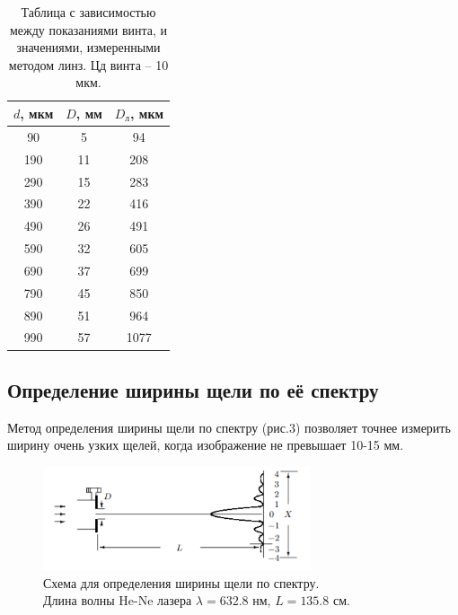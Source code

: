 \documentclass[a4paper, 14pt]{extarticle}%
\newcommand\ECaption[1]{%
     \captionsetup{font=footnotesize}%
     \caption{#1}}
\begin{document}
\begin{table}[h!]
\begin{center}
\begin{tabular}{|c|c|c|}
\hline
\rowcolor[HTML]{9698ED} 
$d$, мкм & $D$, мм & $D_{\text{л}}$, мкм \\ \hline
90       & 5       & 94                  \\ \hline
\rowcolor[HTML]{9698ED} 
190      & 11      & 208                 \\ \hline
290      & 15      & 283                 \\ \hline
\rowcolor[HTML]{9698ED} 
390      & 22      & 416                 \\ \hline
490      & 26      & 491                 \\ \hline
\rowcolor[HTML]{9698ED} 
590      & 32      & 605                 \\ \hline
690      & 37      & 699                 \\ \hline
\rowcolor[HTML]{9698ED} 
790      & 45      & 850                 \\ \hline
890      & 51      & 964                 \\ \hline
\rowcolor[HTML]{9698ED} 
990      & 57      & 1077                \\ \hline
\end{tabular}
\ECaption{Таблица с зависимостью между показаниями винта, и значениями, измеренными методом линз. Цд винта -- 10 мкм.}
\end{center}
\end{table}
\newpage
\subsection*{Определение ширины щели по её спектру}

Метод определения ширины щели по спектру (рис.3) позволяет точнее измерить ширину очень узких щелей, когда изображение не превышает 10-15 мм. 

\begin{figure}[h!]
\begin{center}
\includegraphics[width=0.7\textwidth]{ust2}
\ECaption{Схема для определения ширины щели по спектру. \\ Длина волны He-Ne лазера $\lambda = 632.8$ нм, $L = 135.8$ см.}
\end{center}
\end{figure}
\end{document}
